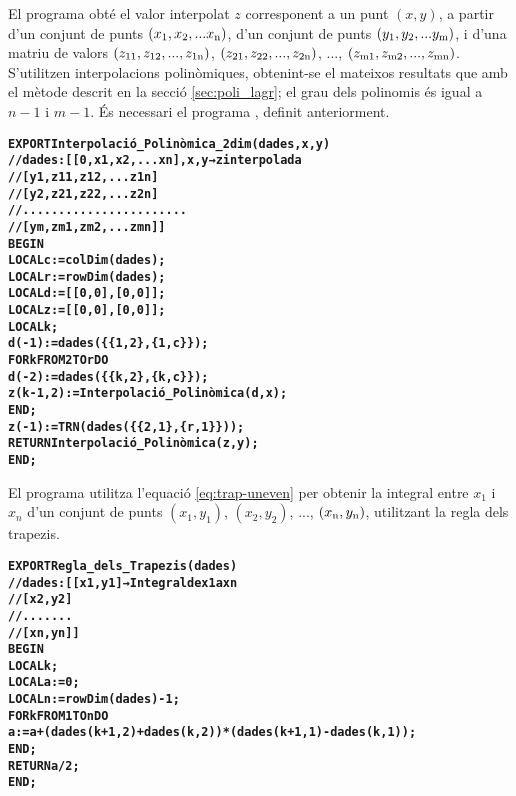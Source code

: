 El programa  obté el valor interpolat $z$ corresponent a un punt $(x, y)$, a partir d'un conjunt de punts $(x_\mathrm{1}, x_\mathrm{2}, ... x_\mathrm{n})$, d'un conjunt de punts $(y_\mathrm{1}, y_\mathrm{2}, ... y_\mathrm{m})$, i d'una matriu de valors $(z_\mathrm{11}, z_\mathrm{12}, ..., z_\mathrm{1n})$,
$(z_\mathrm{21}, z_\mathrm{22}, ..., z_\mathrm{2n})$, ..., $(z_\mathrm{m1}, z_\mathrm{m2}, ..., z_\mathrm{mn})$. S'utilitzen  interpolacions polinòmiques, obtenint-se el mateixos resultats que amb el mètode descrit en la secció \vref{sec:poli_lagr}; el grau dels polinomis és igual a $n-1$ i $m-1$.
És necessari el programa , definit anteriorment.
\vspace{-1cm}
\begin{alltt}
\bfseries
{}
    EXPORT Interpolació_Polinòmica_2dim(dades,x,y)
    // dades:[[0,   x1,  x2, ...  xn], x, y → z interpolada
    //        [y1, z11, z12, ... z1n]
    //        [y2, z21, z22, ... z2n]
    //        .......................
    //        [ym, zm1, zm2, ... zmn]]
    BEGIN
      LOCAL c:=colDim(dades);
      LOCAL r:=rowDim(dades);
      LOCAL d:=[[0,0],[0,0]];
      LOCAL z:=[[0,0],[0,0]];
      LOCAL k;
      d(-1):=dades(\{\{1,2\},\{1,c\}\});
      FOR k FROM 2 TO r DO
        d(-2):=dades(\{\{k,2\},\{k,c\}\});
        z(k-1,2):=Interpolació_Polinòmica(d,x);
      END;
      z(-1):=TRN(dades(\{\{2,1\},\{r,1\}\}));
      RETURN Interpolació_Polinòmica(z,y);
    END;
\end{alltt}

El programa  utilitza l'equació  \eqref{eq:trap-uneven} per obtenir la integral entre $x_1$ i $x_n$ d'un conjunt  de punts $(x_1,y_1)$, $(x_2,y_2)$, ..., $(x_\mathrm{n},y_\mathrm{n})$, utilitzant la regla dels trapezis.
\vspace{-1cm}
\begin{alltt}
\bfseries
{}
    EXPORT Regla_dels_Trapezis(dades)
    // dades:[[x1,y1] → Integral de x1 a xn
    //        [x2,y2]
    //        .......
    //        [xn,yn]]
    BEGIN
      LOCAL k;
      LOCAL a:=0;
      LOCAL n:=rowDim(dades)-1;
      FOR k FROM 1 TO n DO
        a:=a+(dades(k+1,2)+dades(k,2))*(dades(k+1,1)-dades(k,1));
      END;
      RETURN a/2;
    END;
\end{alltt}

